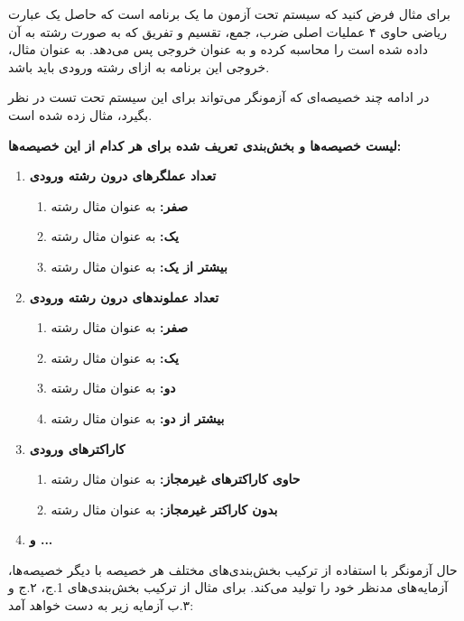برای مثال فرض کنید که سیستم تحت آزمون ما یک برنامه است که حاصل یک عبارت ریاضی حاوی ۴ عملیات اصلی ضرب، جمع، تقسیم و تفریق که به صورت رشته به آن داده شده است را محاسبه کرده و به عنوان خروجی پس می‌دهد. به عنوان مثال، خروجی این برنامه به ازای رشته ورودی  باید  باشد.

در ادامه چند خصیصه‌ای که آزمونگر می‌تواند برای این سیستم تحت تست در نظر بگیرد، مثال زده شده است.

\textbf{لیست خصیصه‌ها و بخش‌بندی تعریف شده برای هر کدام از این خصیصه‌ها:}

\begin{enumerate}
	\item \textbf{تعداد عملگرهای درون رشته ورودی}
	\begin{enumerate}
		\item \textbf{صفر:} به عنوان مثال رشته 
		\item \textbf{یک:} به عنوان مثال رشته 
		\item \textbf{بیشتر از یک:} به عنوان مثال رشته 
	\end{enumerate}
	
	\item \textbf{تعداد عملوندهای درون رشته ورودی}
	\begin{enumerate}
		\item \textbf{صفر:} به عنوان مثال رشته 
		\item \textbf{یک:} به عنوان مثال رشته 
		\item \textbf{دو:} به عنوان مثال رشته 
		\item \textbf{بیشتر از دو:} به عنوان مثال رشته 
	\end{enumerate}
	
	\item \textbf{کاراکترهای ورودی}
	\begin{enumerate}
		\item \textbf{حاوی کاراکترهای غیرمجاز:} به عنوان مثال رشته 
		\item \textbf{بدون کاراکتر غیرمجاز:} به عنوان مثال رشته 
	\end{enumerate}
	
	\item \textbf{و ...}
\end{enumerate}

حال آزمونگر با استفاده از ترکیب بخش‌بندی‌های مختلف هر خصیصه با دیگر خصیصه‌ها، آزمایه‌های مدنظر خود را تولید می‌کند. برای مثال از ترکیب بخش‌بندی‌های 1.ج، ۲.ج و ۳.ب آزمایه زیر به دست خواهد آمد:

